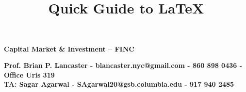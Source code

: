 \documentclass[10pt,landscape]{article}
\title{Quick Guide to LaTeX}
\begin{document}
\footnotesize






\begin{center}
     \Large{\textbf{Capital Market \& Investment -- FINC}} \\
\end{center}

\begin{center}
	\textbf{Prof. Brian P. Lancaster - blancaster.nyc@gmail.com - 860 898 0436 - Office Uris 319}\\
	\textbf{TA: Sagar Agarwal - SAgarwal20@gsb.columbia.edu - 917 940 2485}
\end{center}
\end{document}
